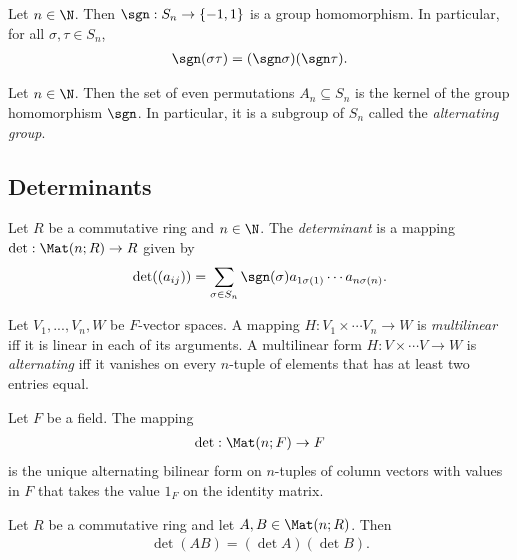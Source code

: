\documentclass{article}
\begin{document}
\begin{lemma}[Notes 4.1.5]
	Let $n\in\N$. Then $\sgn:S_n\to\{-1,1\}$ is a group homomorphism. In particular, for all $\sigma,\tau\in S_n$,
	\begin{align*}
		\sgn(\sigma\tau) = (\sgn\sigma)(\sgn\tau).
	\end{align*}
\end{lemma}

\begin{definition}
	Let $n\in\N$. Then the set of even permutations $A_n\subseteq S_n$ is the kernel of the
	group homomorphism $\sgn$. In particular, it is a subgroup of $S_n$ called the \emph{alternating
		group}.
\end{definition}

\subsection{Determinants}

\begin{definition}
	Let $R$ be a commutative ring and $n\in\N$. The \emph{determinant} is a mapping
	$\det:\Mat(n;R)\to R$ given by
	\begin{align*}
		\det((a_{ij}))=\sum_{\sigma\in S_n}\sgn(\sigma)a_{1\sigma(1)}\cdots a_{n\sigma(n)}.
	\end{align*}
\end{definition}

\begin{definition}
	Let $V_1,...,V_n,W$ be $F$-vector spaces. A mapping $H:V_1\times\cdots V_n\to W$
	is \emph{multilinear} iff it is linear in each of its arguments. A multilinear form
	$H:V\times \cdots V\to W$ is \emph{alternating} iff it vanishes on every $n$-tuple of
	elements that has at least two entries equal.
\end{definition}

\begin{theorem}[Notes 4.3.6]
	Let $F$ be a field. The mapping
	\begin{align*}
		\det : \Mat(n; F) \to F
	\end{align*}
	is the unique alternating bilinear form on $n$-tuples of column vectors with values in $F$
	that takes the value $1_F$ on the identity matrix.
\end{theorem}

\begin{theorem}[Notes 4.4.1]
	Let $R$ be a commutative ring and let $A,B\in\Mat(n; R)$. Then
	\begin{align*}
		\det (AB) = (\det A) (\det B).
	\end{align*}
\end{theorem}
\end{document}
